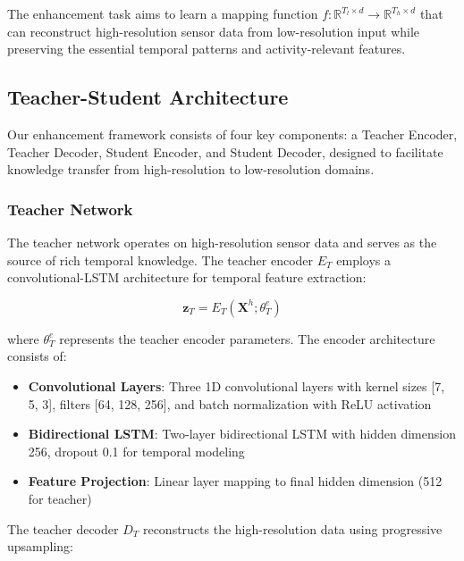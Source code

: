 \hspace{2em}The enhancement task aims to learn a mapping function $f: \mathbb{R}^{T_l \times d} \rightarrow \mathbb{R}^{T_h \times d}$ that can reconstruct high-resolution sensor data from low-resolution input while preserving the essential temporal patterns and activity-relevant features.

\subsection{Teacher-Student Architecture}

\hspace{2em}Our enhancement framework consists of four key components: a Teacher Encoder, Teacher Decoder, Student Encoder, and Student Decoder, designed to facilitate knowledge transfer from high-resolution to low-resolution domains.

\subsubsection{Teacher Network}

\hspace{2em}The teacher network operates on high-resolution sensor data and serves as the source of rich temporal knowledge. The teacher encoder $E_T$ employs a convolutional-LSTM architecture for temporal feature extraction:

\begin{equation}
\mathbf{z}_T = E_T(\mathbf{X}^h; \theta_T^e)
\end{equation}

where $\theta_T^e$ represents the teacher encoder parameters. The encoder architecture consists of:

\begin{itemize}
    \item \textbf{Convolutional Layers}: Three 1D convolutional layers with kernel sizes [7, 5, 3], filters [64, 128, 256], and batch normalization with ReLU activation
    \item \textbf{Bidirectional LSTM}: Two-layer bidirectional LSTM with hidden dimension 256, dropout 0.1 for temporal modeling
    \item \textbf{Feature Projection}: Linear layer mapping to final hidden dimension (512 for teacher)
\end{itemize}

The teacher decoder $D_T$ reconstructs the high-resolution data using progressive upsampling:

